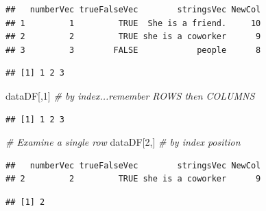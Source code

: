 \documentclass[
]{book}
\newenvironment{Shaded}{\begin{snugshade}}{\end{snugshade}}
\newcommand{\CommentTok}[1]{\textcolor[rgb]{0.56,0.35,0.01}{\textit{#1}}}
\newcommand{\DecValTok}[1]{\textcolor[rgb]{0.00,0.00,0.81}{#1}}
\newcommand{\NormalTok}[1]{#1}
\newcommand{\SpecialCharTok}[1]{\textcolor[rgb]{0.00,0.00,0.00}{#1}}
\begin{document}
\begin{verbatim}
##   numberVec trueFalseVec        stringsVec NewCol
## 1         1         TRUE  She is a friend.     10
## 2         2         TRUE she is a coworker      9
## 3         3        FALSE            people      8
\end{verbatim}

\begin{Shaded}
\end{Shaded}

\begin{verbatim}
## [1] 1 2 3
\end{verbatim}

\begin{Shaded}
\begin{Highlighting}[]
\NormalTok{dataDF[,}\DecValTok{1}\NormalTok{] }\CommentTok{\# by index...remember ROWS then COLUMNS}
\end{Highlighting}
\end{Shaded}

\begin{verbatim}
## [1] 1 2 3
\end{verbatim}

\begin{Shaded}
\begin{Highlighting}[]
\CommentTok{\# Examine a single row}
\NormalTok{dataDF[}\DecValTok{2}\NormalTok{,] }\CommentTok{\# by index position}
\end{Highlighting}
\end{Shaded}

\begin{verbatim}
##   numberVec trueFalseVec        stringsVec NewCol
## 2         2         TRUE she is a coworker      9
\end{verbatim}

\begin{Shaded}
\end{Shaded}

\begin{verbatim}
## [1] 2
\end{verbatim}
\end{document}
